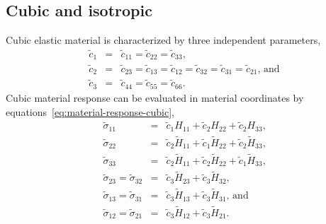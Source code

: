 \documentclass[]             %
{NASA}                       %
\begin{document}
\subsection{Cubic and isotropic}
Cubic elastic material is characterized by three independent parameters,
\begin{eqnarray}
\widetilde{c}_{1} & = & \widetilde{c}_{11}=\widetilde{c}_{22}=\widetilde{c}_{33}\text{,} \label{eq:cubic-3-parameters} \\
\widetilde{c}_{2} & = & \widetilde{c}_{23}=\widetilde{c}_{13}=\widetilde{c}_{12}=\widetilde{c}_{32}=\widetilde{c}_{31}=\widetilde{c}_{21}\text{, and}\nonumber \\
\widetilde{c}_{3} & = & \widetilde{c}_{44}=\widetilde{c}_{55}=\widetilde{c}_{66}\text{.} \nonumber
\end{eqnarray}
Cubic material response can be evaluated in material coordinates by equations~\ref{eq:material-response-cubic},
\begin{eqnarray}
\widetilde{\sigma}_{11} & = & \widetilde{c}_{1}H_{11} + \widetilde{c}_{2}H_{22} + \widetilde{c}_{2}H_{33}\text{,}\label{eq:material-response-cubic}\\
\widetilde{\sigma}_{22} & = & \widetilde{c}_{2}\widetilde{H}_{11} + \widetilde{c}_{1}\widetilde{H}_{22} + \widetilde{c}_{2}\widetilde{H}_{33}\text{,}\nonumber \\
\widetilde{\sigma}_{33} & = & \widetilde{c}_{2}\widetilde{H}_{11} + \widetilde{c}_{2}\widetilde{H}_{22} + \widetilde{c}_{1}\widetilde{H}_{33}\text{,}\nonumber \\
\widetilde{\sigma}_{23}=\widetilde{\sigma}_{32} & = & \widetilde{c}_{3}\widetilde{H}_{23} + \widetilde{c}_{3}\widetilde{H}_{32}\text{,}\nonumber \\
\widetilde{\sigma}_{13}=\widetilde{\sigma}_{31} & = & \widetilde{c}_{3}\widetilde{H}_{13} + \widetilde{c}_{3}\widetilde{H}_{31}\text{, and}\nonumber \\
\widetilde{\sigma}_{12}=\widetilde{\sigma}_{21} & = & \widetilde{c}_{3}\widetilde{H}_{12} + \widetilde{c}_{3}\widetilde{H}_{21}\text{.} \nonumber
\end{eqnarray}
\end{document}
